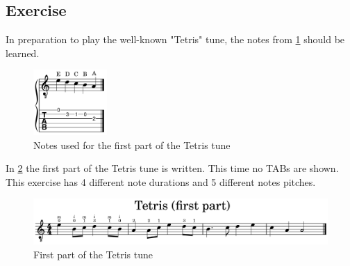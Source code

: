 \newpage

\subsection{Exercise}

In preparation to play the well-known "Tetris" tune, the notes from \ref{fig:notes_for_tetris_first_part} should be learned.

\begin{figure}[h]
	\centering
	\includegraphics[width=0.25\textwidth]{../../MuseScore/Guitar/NotesUsedInTetris_FirstPart.png}
	\caption{Notes used for the first part of the Tetris tune}
	\label{fig:notes_for_tetris_first_part}
\end{figure}

In \ref{fig:tetris_simple_first_part} the first part of the Tetris tune is written. This time no TABs are shown. This exercise has 4 different note durations and 5 different notes pitches.

\begin{figure}[h]
	\centering
	\includegraphics[width=\textwidth]{../../MuseScore/Guitar/Tetris_Simple_FirstPart.png}
	\caption{First part of the Tetris tune}
	\label{fig:tetris_simple_first_part}
\end{figure}


